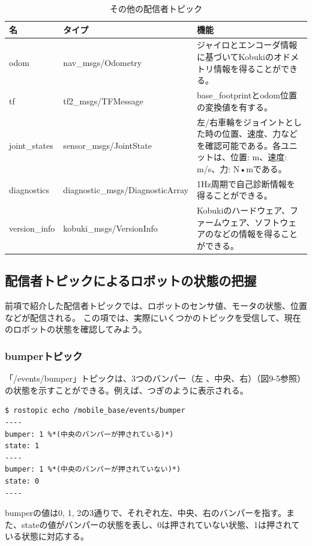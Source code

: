 \begin{itemize}
\begin{table}[htp]
\centering
\begin{tabular}{p{2cm} p{3cm} p{8cm}}
\toprule
\textbf{名} & \textbf{タイプ} & \textbf{機能}\\
\midrule
odom & nav\_msgs/Odometry & ジャイロとエンコーダ情報に基づいてKobukiのオドメトリ情報を得ることができる。\\
tf & tf2\_msgs/TFMessage & base\_footprintとodom位置の変換値を有する。\\
joint\_states & sensor\_msgs/JointState & 左/右車輪をジョイントとした時の位置、速度、力などを確認可能である。各ユニットは、位置: m、速度: m/s、力: N•mである。\\
diagnostics & diagnostic\_msgs/DiagnosticArray & 1Hz周期で自己診断情報を得ることができる。\\
version\_info & kobuki\_msgs/VersionInfo & Kobukiのハードウェア、ファームウェア、ソフトウェアのなどの情報を得ることができる。\\
\bottomrule
\end{tabular}
\caption{その他の配信者トピック}
\end{table}

\subsection{配信者トピックによるロボットの状態の把握}

前項で紹介した配信者トピックでは、ロボットのセンサ値、モータの状態、位置などが配信される。  この項では、実際にいくつかのトピックを受信して、現在のロボットの状態を確認してみよう。

\subsubsection{bumperトピック}

「/events/bumper」トピックは、3つのバンパー（左  、中央、右）（図9-5参照）の状態を示すことができる。例えば、つぎのように表示される。

\begin{lstlisting}[language=ROS]
$ rostopic echo /mobile_base/events/bumper
----
bumper: 1 %*(中央のバンパーが押されている)*)
state: 1
----
bumper: 1 %*(中央のバンパーが押されていない)*)
state: 0
----
\end{lstlisting}

bumperの値は0, 1, 2の3通りで、それぞれ左、中央、右のバンパーを指す。また、stateの値がバンパーの状態を表し、0は押されていない状態、1は押されている状態に対応する。


\end{itemize}

